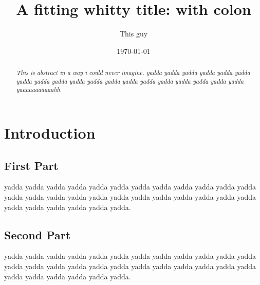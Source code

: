 \documentclass[10pt,letterpaper]{article}
\title{A fitting whitty title: with colon}
\author{This guy}
\date{\today} %
\begin{document}
\maketitle							%
\tableofcontents					%
\begin{abstract}					%
\textit{This is abstract in a way i could never imagine. yadda yadda yadda yadda yadda yadda 
yadda yadda yadda yadda yadda yadda yadda yadda yadda yadda yadda yadda yadda yaaaaaaaaaaahh.}
\end{abstract}


\section{Introduction}				%
	\subsection{First Part}
	
yadda yadda yadda yadda yadda yadda yadda yadda yadda yadda yadda yadda yadda yadda yadda 
yadda yadda yadda yadda yadda yadda yadda yadda yadda yadda yadda yadda yadda yadda yadda.
	\subsection{Second Part}

yadda yadda yadda yadda yadda yadda yadda yadda yadda yadda yadda yadda yadda yadda yadda 
yadda yadda yadda yadda yadda yadda yadda yadda yadda yadda yadda yadda yadda yadda yadda.
\end{document}
